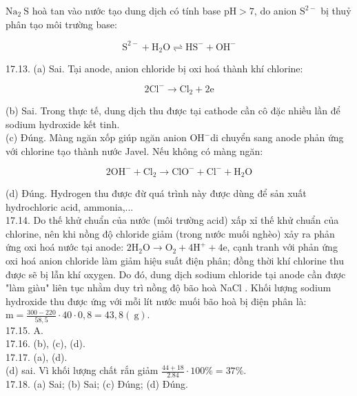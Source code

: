 \documentclass[10pt]{article}
\begin{document}
$\mathrm{Na}_{2} \mathrm{~S}$ hoà tan vào nước tạo dung dịch có tính base $\mathrm{pH}>7$, do anion $\mathrm{S}^{2-}$ bị thuỷ phân tạo môi trường base:

$$
\mathrm{S}^{2-}+\mathrm{H}_{2} \mathrm{O} \rightleftharpoons \mathrm{HS}^{-}+\mathrm{OH}^{-}
$$

17.13. (a) Sai. Tại anode, anion chloride bị oxi hoá thành khí chlorine:

$$
2 \mathrm{Cl}^{-} \rightarrow \mathrm{Cl}_{2}+2 \mathrm{e}
$$

(b) Sai. Trong thực tế, dung dịch thu được tại cathode cần cô đặc nhiều lần để sodium hydroxide kết tinh.\\
(c) Đúng. Màng ngăn xốp giúp ngăn anion $\mathrm{OH}^{-}$di chuyển sang anode phản ứng với chlorine tạo thành nước Javel. Nếu không có màng ngăn:

$$
2 \mathrm{OH}^{-}+\mathrm{Cl}_{2} \rightarrow \mathrm{ClO}^{-}+\mathrm{Cl}^{-}+\mathrm{H}_{2} \mathrm{O}
$$

(d) Đúng. Hydrogen thu được đừ quá trình này được dùng để sản xuất hydrochloric acid, ammonia,...\\
17.14. Do thế khử chuẩn của nước (môi trường acid) xấp xỉ thế khử chuẩn của chlorine, nên khi nồng độ chloride giảm (trong nước muối nghèo) xảy ra phản ứng oxi hoá nước tại anode: $2 \mathrm{H}_{2} \mathrm{O} \rightarrow \mathrm{O}_{2}+4 \mathrm{H}^{+}+4 \mathrm{e}$, cạnh tranh với phản ứng oxi hoá anion chloride làm giảm hiệu suất điện phân; đồng thời khí chlorine thu được sẽ bị lẫn khí oxygen. Do đó, dung dịch sodium chloride tại anode cần được "làm giàu" liên tục nhằm duy trì nồng độ bão hoà NaCl . Khối lượng sodium hydroxide thu được ứng với mỗi lít nước muối bão hoà bị điện phân là: $\mathrm{m}=\frac{300-220}{58,5} \cdot 40 \cdot 0,8=43,8(\mathrm{~g})$.\\
17.15. A.\\
17.16. (b), (c), (d).\\
17.17. (a), (d).\\
(d) sai. Vì khối lượng chất rắn giảm $\frac{44+18}{2.84} \cdot 100 \%=37 \%$.\\
17.18. (a) Sai; (b) Sai; (c) Đúng; (d) Đúng.
\end{document}
